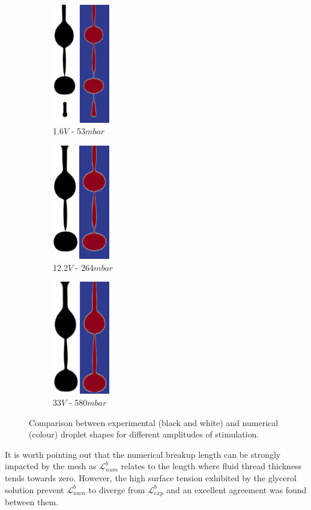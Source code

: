 \documentclass[onecolumn, 12pt]{asme2ej}
\begin{document}
\begin{figure}[h]
    \centering
    \begin{subfigure}{2.7cm}
        \centering
        \includegraphics[width=2.5cm]{Figures/Fig10a.eps}
        \caption{1.6$V$ - 53$mbar$}
    \end{subfigure}
    \hfill
    \begin{subfigure}{2.7cm}
        \centering
        \includegraphics[width=2.5cm]{Figures/Fig10b.eps}
        \caption{12.2$V$ - 264$mbar$}
    \end{subfigure}
    \hfill
    \begin{subfigure}{2.7cm}
        \centering
        \includegraphics[width=2.5cm]{Figures/Fig10c.eps}
        \caption{33$V$ - 580$mbar$}
    \end{subfigure}
       \caption{Comparison between experimental (black and white) and numerical (colour) droplet shapes for different amplitudes of stimulation.}
       \label{fig:glycerolDrop}
\end{figure}
It is worth pointing out that the numerical breakup length can be strongly impacted by the mesh as $\mathcal{L}_{num}^b$ relates to the length where fluid thread thickness tends towards zero. However, the high surface tension exhibited by the glycerol solution prevent $\mathcal{L}_{num}^b$ to diverge from $\mathcal{L}_{exp}^b$ and an excellent agreement was found between them. 
\end{document}
